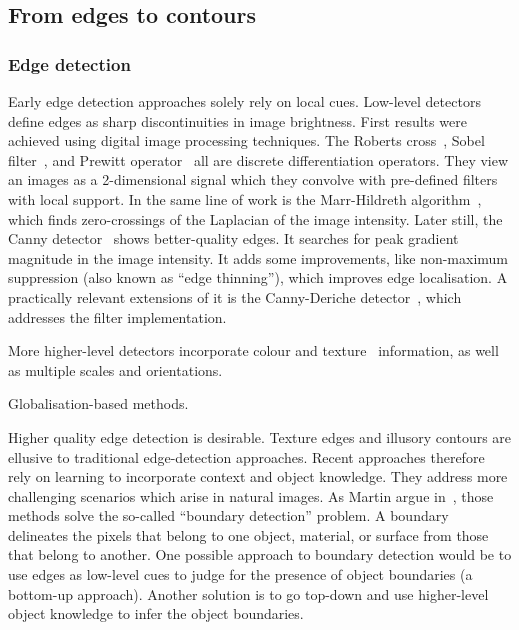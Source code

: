 \subsection{From edges to contours}
\subsubsection{Edge detection}
Early edge detection approaches solely rely on local cues. Low-level detectors define edges as sharp discontinuities in image brightness. First results were achieved using digital image processing techniques. The Roberts cross~\cite{roberts1963machine}, Sobel filter~\cite{sobel19683x3}, and Prewitt operator~\cite{prewitt1970object} all are discrete differentiation operators. %
They view an images as a 2-dimensional signal which they convolve with pre-defined filters with local support. In the same line of work is the Marr-Hildreth algorithm~\cite{marr1980theory}, which finds zero-crossings of the Laplacian of the image intensity. Later still, the Canny detector~\cite{canny1986computational} shows better-quality edges. It searches for peak gradient magnitude in the image intensity. It adds some improvements, like non-maximum suppression (also known as ``edge thinning''), which improves edge localisation. A practically relevant extensions of it is the Canny-Deriche detector~\cite{deriche1987using}, which addresses the filter implementation.

More higher-level detectors incorporate colour and texture~\cite{rubner1996coalescing,will2000learning} information, as well as multiple scales and orientations.

Globalisation-based methods.

Higher quality edge detection is desirable. Texture edges and illusory contours are ellusive to %
traditional edge-detection approaches. Recent approaches therefore rely on learning to incorporate context and object knowledge. They address more challenging scenarios which arise in natural images. As Martin \etal argue in~\cite{martin2004learning}, those methods solve the so-called ``boundary detection'' problem. A boundary delineates the pixels that belong to one object, material, or surface from those that belong to another. One possible approach to boundary detection would be to use edges as low-level cues to judge for the presence of object boundaries (a bottom-up approach). Another solution is to go top-down and use higher-level object knowledge to infer the object boundaries.

